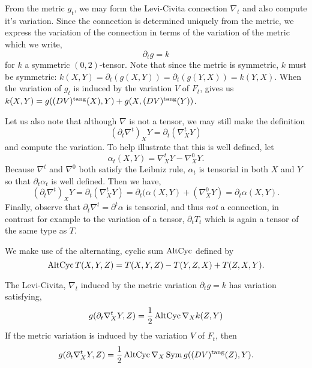From the metric \(g_t\), we may form the Levi-Civita connection \(\nabla_t\) and also compute it's variation. Since the connection is determined uniquely from the metric, we express the variation of the connection in terms of the variation of the metric which we write,
\[
\partial_t g = k
\]
for \(k\) a symmetric \((0, 2)\)-tensor. Note that since the metric is symmetric, \(k\) must be symmetric: \(k(X, Y) = \partial_t (g(X, Y)) = \partial_t (g(Y, X)) = k(Y, X)\). When the variation of \(g_t\) is induced by the variation \(V\) of \(F_t\),  gives us \(k(X, Y) = g((DV)^{\operatorname{tang}} (X), Y) + g(X, (DV)^{\operatorname{tang}} (Y))\).

\begin{rem}
Let us also note that although \(\nabla\) is not a tensor, we may still make the definition
\[
(\partial_t \nabla^t)_X Y = \partial_t(\nabla^t_X Y)
\]
and compute the variation. To help illustrate that this is well defined, let
\[
\alpha_t(X, Y) = \nabla^t_X Y - \nabla^0_X Y.
\]
Because \(\nabla^t\) and \(\nabla^0\) both satisfy the Leibniz rule, \(\alpha_t\) is tensorial in both \(X\) and \(Y\) so that \(\partial_t \alpha_t\) is well defined. Then we have,
\[
(\partial_t \nabla^t)_X Y = \partial_t(\nabla^t_X Y) = \partial_t (\alpha(X, Y) + (\nabla^0_X Y) = \partial_t \alpha (X, Y).
\]
Finally, observe that \(\partial_t \nabla^t = \partial^t \alpha\) is tensorial, and thus \emph{not} a connection, in contrast for example to the variation of a tensor, \(\partial_t T_t\) which is again a tensor of the same type as \(T\).
\end{rem}

We make use of the alternating, cyclic sum \(\operatorname{AltCyc}\) defined by
\[
\operatorname{AltCyc} T(X, Y, Z) = T(X, Y, Z) - T(Y, Z, X) + T(Z, X, Y).
\]

\begin{lemma}
\label{lem:dt_nabla}
The Levi-Civita, \(\nabla_t\) induced by the metric variation \(\partial_t g = k\) has variation satisfying,
\[
g(\partial_t \nabla^t_X Y, Z) = \frac{1}{2} \operatorname{AltCyc} \nabla_X k(Z, Y)
\]
If the metric variation is induced by the variation \(V\) of \(F_t\), then
\[
g(\partial_t \nabla^t_X Y, Z) = \frac{1}{2} \operatorname{AltCyc} \nabla_X \operatorname{Sym} g((DV)^{\operatorname{tang}} (Z), Y).
\]
\end{lemma}

